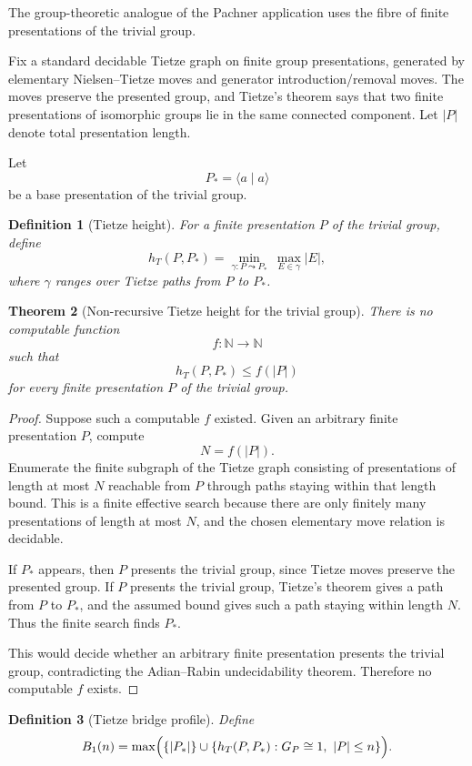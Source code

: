 \documentclass[11pt]{article}
\newtheorem{theorem}{Theorem}[section]
\newtheorem{definition}[theorem]{Definition}
\begin{document}
The group-theoretic analogue of the Pachner application uses the fibre of finite presentations of the trivial group.

Fix a standard decidable Tietze graph on finite group presentations, generated by elementary Nielsen--Tietze moves and generator introduction/removal moves. The moves preserve the presented group, and Tietze's theorem says that two finite presentations of isomorphic groups lie in the same connected component. Let \(|P|\) denote total presentation length.

Let
\[
P_\ast=\langle a\mid a\rangle
\]
be a base presentation of the trivial group.

\begin{definition}[Tietze height]
For a finite presentation \(P\) of the trivial group, define
\[
h_T(P,P_\ast)=
\min_{\gamma:P\leadsto P_\ast}\ \max_{E\in\gamma}|E|,
\]
where \(\gamma\) ranges over Tietze paths from \(P\) to \(P_\ast\).
\end{definition}

\begin{theorem}[Non-recursive Tietze height for the trivial group]
There is no computable function
\[
f:\mathbb N\to\mathbb N
\]
such that
\[
h_T(P,P_\ast)\leq f(|P|)
\]
for every finite presentation \(P\) of the trivial group.
\end{theorem}

\begin{proof}
Suppose such a computable \(f\) existed. Given an arbitrary finite presentation \(P\), compute
\[
N=f(|P|).
\]
Enumerate the finite subgraph of the Tietze graph consisting of presentations of length at most \(N\) reachable from \(P\) through paths staying within that length bound. This is a finite effective search because there are only finitely many presentations of length at most \(N\), and the chosen elementary move relation is decidable.

If \(P_\ast\) appears, then \(P\) presents the trivial group, since Tietze moves preserve the presented group. If \(P\) presents the trivial group, Tietze's theorem gives a path from \(P\) to \(P_\ast\), and the assumed bound gives such a path staying within length \(N\). Thus the finite search finds \(P_\ast\).

This would decide whether an arbitrary finite presentation presents the trivial group, contradicting the Adian--Rabin undecidability theorem. Therefore no computable \(f\) exists.
\end{proof}

\begin{definition}[Tietze bridge profile]
Define
\[
B_1(n)=
\max\Bigl(\{|P_\ast|\}\cup
\{h_T(P,P_\ast):G_P\cong 1,\ |P|\leq n\}\Bigr).
\]
\end{definition}
\end{document}
